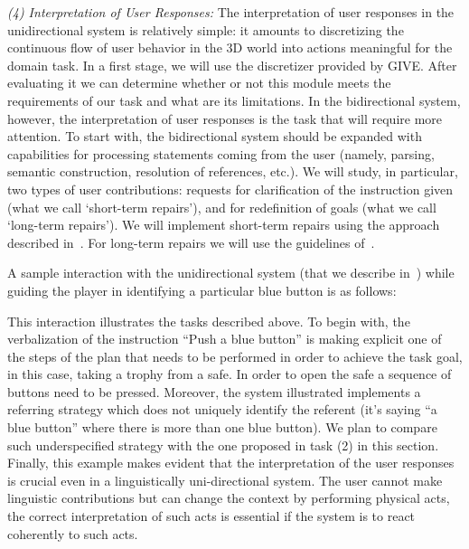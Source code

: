 \emph{(4) Interpretation of User Responses:} The interpretation of user
responses in the unidirectional system is relatively simple: it amounts to
discretizing the continuous flow of user behavior in the 3D world into actions
meaningful for the domain task. In a first
stage, we will use the discretizer provided by GIVE. After evaluating it we can
determine whether or not this module meets the requirements of
our task and what are its limitations. In the bidirectional system, however,
the interpretation of user responses is the task that will require more
attention.
To start with, the bidirectional system should be expanded with capabilities
for  processing statements coming from the user (namely, parsing, semantic
construction, resolution of references, etc.). We will study, in particular, two
types of user contributions: requests for clarification of the instruction
given (what we call `short-term repairs'), and for redefinition of goals (what we
call `long-term repairs'). We will implement short-term repairs
using the approach described in~\cite{purver06}. For long-term repairs we will use the
guidelines of~\cite{blaylock05a}. 

\medskip
A sample interaction with the unidirectional system (that we describe
in~\cite{amoia10}) while guiding the player in
identifying a particular blue button is as follows:

This interaction illustrates the tasks described above. To begin with, the
verbalization of the instruction ``Push a blue button'' is making explicit one
of the steps of the plan that needs to be performed in order to achieve the
task goal, in this case, taking a trophy from a safe. In order to open the safe
a sequence of buttons need to be pressed. Moreover, the system illustrated
implements a referring strategy which does not uniquely identify the referent
(it's saying ``a blue button'' where there is more than one blue button). We
plan to compare such underspecified strategy with the one proposed in task (2)
in this section. Finally, this example makes evident that the interpretation of
the user responses is crucial even in a linguistically uni-directional system.
The user cannot make linguistic contributions but can change the context by
performing physical acts, the correct interpretation of such acts is essential
if the system is to react coherently to such acts. 
 
